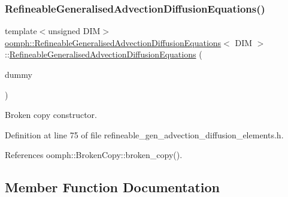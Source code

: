 \subsubsection{\texorpdfstring{Refineable\+Generalised\+Advection\+Diffusion\+Equations()}{RefineableGeneralisedAdvectionDiffusionEquations()}\hspace{0.1cm}{\footnotesize\ttfamily [2/2]}}
{\footnotesize\ttfamily template$<$unsigned D\+IM$>$ \\
\hyperlink{classoomph_1_1RefineableGeneralisedAdvectionDiffusionEquations}{oomph\+::\+Refineable\+Generalised\+Advection\+Diffusion\+Equations}$<$ D\+IM $>$\+::\hyperlink{classoomph_1_1RefineableGeneralisedAdvectionDiffusionEquations}{Refineable\+Generalised\+Advection\+Diffusion\+Equations} (\begin{DoxyParamCaption}\item[{const \hyperlink{classoomph_1_1RefineableGeneralisedAdvectionDiffusionEquations}{Refineable\+Generalised\+Advection\+Diffusion\+Equations}$<$ D\+IM $>$ \&}]{dummy }\end{DoxyParamCaption})\hspace{0.3cm}{\ttfamily [inline]}}



Broken copy constructor. 



Definition at line 75 of file refineable\+\_\+gen\+\_\+advection\+\_\+diffusion\+\_\+elements.\+h.



References oomph\+::\+Broken\+Copy\+::broken\+\_\+copy().



\subsection{Member Function Documentation}
\mbox{\label{classoomph_1_1RefineableGeneralisedAdvectionDiffusionEquations_abd0535533c7133651ac18ad8e025f139}} 
